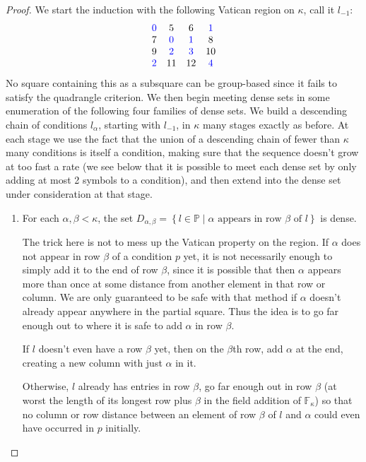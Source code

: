 \documentclass[12pt,a4paper]{article}
\newcommand{\F}{\mathbb{F}}
\newcommand{\st}{\; | \;}
\newcommand{\set}[2]{\left\{#1\st #2 \right\}}
\renewcommand{\P}{\mathbb{P}}
\begin{document}
\begin{proof}
We start the induction with the following Vatican region on $\kappa$, call it $l_{-1}$:
$$\begin{array}{cccc}
	\color{blue} 0 & 5 & 6 & \color{blue} 1 \\ 
	7 & \color{blue} 0 & \color{blue}1 & 8  \\
	9 & \color{blue}2 & \color{blue} 3 & 10 \\
	\color{blue} 2 & 11 & 12 & \color{blue} 4 
\end{array}$$
No square containing this as a subsquare can be group-based since it fails to satisfy the quadrangle criterion.
We then begin meeting dense sets in some enumeration of the following four families of dense sets.
We build a descending chain of conditions $l_\alpha$, starting with $l_{-1}$, in $\kappa$ many stages exactly as before. At each stage we use the fact that the union of a descending chain of fewer than $\kappa$ many conditions is itself a condition, making sure that the sequence doesn't grow at too fast a rate (we see below that it is possible to meet each dense set by only adding at most 2 symbols to a condition), and then extend into the dense set under consideration at that stage.

\begin{enumerate}
	\item For each $\alpha, \beta <\kappa$, the set $D_{\alpha,\beta}=\set{l \in \P}{\alpha \text{ appears in row } \beta \text{ of } l}$ is dense.
	
	The trick here is not to mess up the Vatican property on the region. If $\alpha$ does not appear in row $\beta$ of a condition $p$ yet, it is not necessarily enough to simply add it to the end of row $\beta$, since it is possible that then $\alpha$ appears more than once at some distance from another element in that row or column. We are only guaranteed to be safe with that method if $\alpha$ doesn't already appear anywhere in the partial square. Thus the idea is to go far enough out to where it is safe to add $\alpha$ in row $\beta$.
	
	If $l$ doesn't even have a row $\beta$ yet, then on the $\beta$th row, add $\alpha$ at the end, creating a new column with just $\alpha$ in it.
	
	Otherwise, $l$ already has entries in row $\beta$, go far enough out in row $\beta$ (at worst the length of its longest row plus $\beta$ in the field addition of $\F_\kappa$) so that no column or row distance between an element of row $\beta$ of $l$ and $\alpha$ could even have occurred in $p$ initially.
	

\end{enumerate}
\end{proof}
\end{document}
